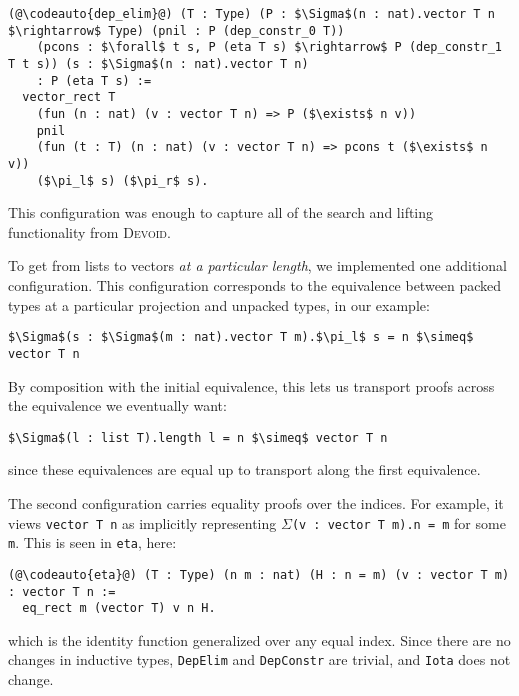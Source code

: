 \begin{lstlisting}
(@\codeauto{dep_elim}@) (T : Type) (P : $\Sigma$(n : nat).vector T n $\rightarrow$ Type) (pnil : P (dep_constr_0 T))
    (pcons : $\forall$ t s, P (eta T s) $\rightarrow$ P (dep_constr_1 T t s)) (s : $\Sigma$(n : nat).vector T n)
    : P (eta T s) :=
  vector_rect T
    (fun (n : nat) (v : vector T n) => P ($\exists$ n v))
    pnil
    (fun (t : T) (n : nat) (v : vector T n) => pcons t ($\exists$ n v))
    ($\pi_l$ s) ($\pi_r$ s).
\end{lstlisting}
This configuration was enough to capture all of the search and lifting functionality from \textsc{Devoid}. %

To get from lists to vectors \textit{at a particular length}, we implemented one additional configuration.
This configuration corresponds to the equivalence between packed types at a particular projection
and unpacked types, in our example:

\begin{lstlisting}
$\Sigma$(s : $\Sigma$(m : nat).vector T m).$\pi_l$ s = n $\simeq$ vector T n
\end{lstlisting}
By composition with the initial equivalence, this lets us transport proofs
across the equivalence we eventually want:

\begin{lstlisting}
$\Sigma$(l : list T).length l = n $\simeq$ vector T n
\end{lstlisting}
since these equivalences are equal up to transport along the first equivalence.

The second configuration carries equality proofs over the indices.
For example, it views \lstinline{vector T n} as implicitly representing $\Sigma$\lstinline{(v : vector T m).n = m} for some \lstinline{m}.
This is seen in \lstinline{eta}, here: 

\begin{lstlisting}
(@\codeauto{eta}@) (T : Type) (n m : nat) (H : n = m) (v : vector T m) : vector T n :=
  eq_rect m (vector T) v n H.
\end{lstlisting}
which is the identity function generalized over any equal index.
Since there are no changes in inductive types, \lstinline{DepElim} and \lstinline{DepConstr} are trivial,
and \lstinline{Iota} does not change.

